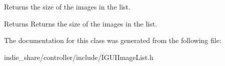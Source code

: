 Returns the size of the images in the list. 

\begin{DoxyReturn}{Returns}
Returns the size of the images in the list. 
\end{DoxyReturn}


The documentation for this class was generated from the following file\+:\begin{DoxyCompactItemize}
\item 
indie\+\_\+share/controller/include/I\+G\+U\+I\+Image\+List.\+h\end{DoxyCompactItemize}
